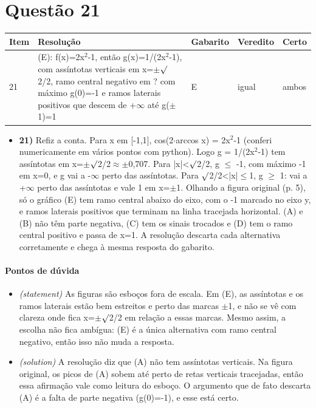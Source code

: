 \documentclass{article}%
\begin{document}
\section*{Questão 21}%
\begin{longtable}{@{}p{} p{} p{} p{} p{}@{}}\toprule Item & Resolução & Gabarito & Veredito & Certo \\ \midrule
21 & (E): f(x)=2x$^2$-1, então g(x)=1/(2x$^2$-1), com assíntotas verticais em x=$\pm$$\surd$2/2, ramo central negativo em ? com máximo g(0)=-1 e ramos laterais positivos que descem de +$\infty$ até g($\pm$1)=1 & E & igual & ambos \\
\bottomrule\end{longtable}%
\begin{itemize}%
\item%
\textbf{21)} Refiz a conta. Para x em {[}-1,1{]}, cos(2$\cdot$arccos x) = 2x$^2$-1 (conferi numericamente em vários pontos com python). Logo g = 1/(2x$^2$-1) tem assíntotas em x=$\pm$$\surd$2/2$\approx$$\pm$0,707. Para |x|<$\surd$2/2, g $\leq$ -1, com máximo -1 em x=0, e g vai a -$\infty$ perto das assíntotas. Para $\surd$2/2<|x|$\leq$1, g $\geq$ 1: vai a +$\infty$ perto das assíntotas e vale 1 em x=$\pm$1. Olhando a figura original (p. 5), só o gráfico (E) tem ramo central abaixo do eixo, com o -1 marcado no eixo y, e ramos laterais positivos que terminam na linha tracejada horizontal. (A) e (B) não têm parte negativa, (C) tem os sinais trocados e (D) tem o ramo central positivo e passa de x=1. A resolução descarta cada alternativa corretamente e chega à mesma resposta do gabarito.%
\end{itemize}%
\paragraph{Pontos de dúvida}%
\begin{itemize}%
\item%
\textit{(statement)} As figuras são esboços fora de escala. Em (E), as assíntotas e os ramos laterais estão bem estreitos e perto das marcas $\pm$1, e não se vê com clareza onde fica x=$\pm$$\surd$2/2 em relação a essas marcas. Mesmo assim, a escolha não fica ambígua: (E) é a única alternativa com ramo central negativo, então isso não muda a resposta.%
\item%
\textit{(solution)} A resolução diz que (A) não tem assíntotas verticais. Na figura original, os picos de (A) sobem até perto de retas verticais tracejadas, então essa afirmação vale como leitura do esboço. O argumento que de fato descarta (A) é a falta de parte negativa (g(0)=-1), e esse está certo.%
\end{itemize}%
\end{document}
